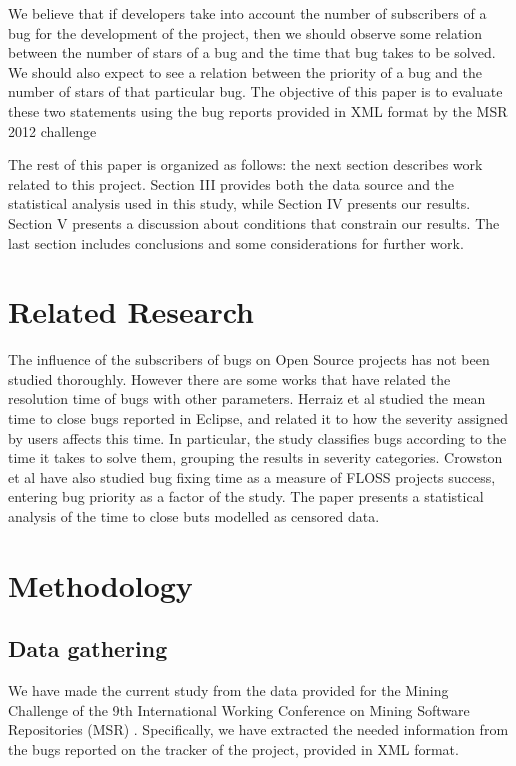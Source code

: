\documentclass[10pt, conference, compsocconf]{IEEEtran}
\begin{document}
We believe that if developers take into account the number of subscribers of a bug for the development of the project, then we should observe some relation between the number of stars of a bug and the time that bug takes to be solved. We should also expect to see a relation between the priority of a bug and the number of stars of that particular bug. The objective of this paper is to evaluate these two statements using the bug reports provided in XML format by the MSR 2012 challenge \cite{MSR} 

The rest of this paper is organized as follows: the next section describes work related to this project. Section III provides both the data source and the statistical analysis used in this study, while Section IV presents our results. Section V presents a discussion about conditions that constrain our results. The last section includes conclusions and some considerations for further work.

\section{Related Research}
The influence of the subscribers of bugs on Open Source projects has not been studied thoroughly. However there are some works that have related the resolution time of bugs with other parameters. Herraiz et al \cite{EclipseSimplification} studied the mean time to close bugs reported in Eclipse, and related it to how the severity assigned by users affects this time. In particular, the study classifies bugs according to the time it takes to solve them, grouping the results in severity categories. Crowston et al \cite{Portfolio} have also studied bug fixing time as a measure of FLOSS projects success, entering bug priority as a factor of the study. The paper presents a statistical analysis of the time to close buts modelled as censored data.

\section{Methodology}

\subsection {Data gathering}
We have made the current study from the data provided for the Mining Challenge of the 9th International Working Conference on Mining Software Repositories (MSR) \cite{MSR}. Specifically, we have extracted the needed information from the bugs reported on the tracker of the project, provided in XML format.
\end{document}
